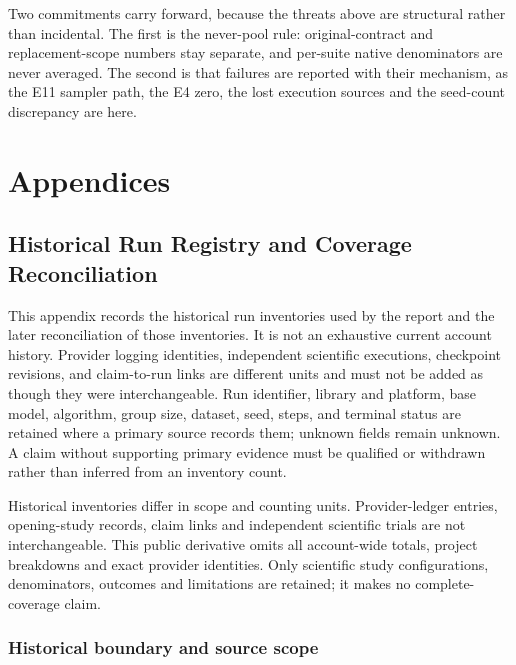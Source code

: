 \documentclass[12pt,a4paper]{report}
\begin{document}
Two commitments carry forward, because the threats above are structural
rather than incidental. The first is the never-pool rule:
original-contract and replacement-scope numbers stay separate, and
per-suite native denominators are never averaged. The second is that
failures are reported with their mechanism, as the E11 sampler path, the
E4 zero, the lost execution sources and the seed-count discrepancy are
here.



\cleardoublepage
{}
{}




\appendix


\part{Appendices}


\chapter{Historical Run Registry and Coverage
Reconciliation}\label{historical-run-registry-and-coverage-reconciliation}

This appendix records the historical run inventories used by the report
and the later reconciliation of those inventories. It is not an
exhaustive current account history. Provider logging identities,
independent scientific executions, checkpoint revisions, and
claim-to-run links are different units and must not be added as though
they were interchangeable. Run identifier, library and platform, base
model, algorithm, group size, dataset, seed, steps, and terminal status
are retained where a primary source records them; unknown fields remain
unknown. A claim without supporting primary evidence must be qualified
or withdrawn rather than inferred from an inventory count.

Historical inventories differ in scope and counting units.
Provider-ledger entries, opening-study records, claim links and
independent scientific trials are not interchangeable. This public
derivative omits all account-wide totals, project breakdowns and exact
provider identities. Only scientific study configurations, denominators,
outcomes and limitations are retained; it makes no complete-coverage
claim.

\section{Historical boundary and source
scope}\label{historical-boundary-and-source-scope}
\end{document}
